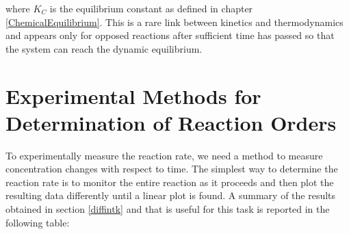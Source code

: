 \documentclass[
  9pt,
]{extbook}
\theoremstyle{definition}
\theoremstyle{definition}
\theoremstyle{definition}
\theoremstyle{remark}
\begin{document}
where \(K_C\) is the equilibrium constant as defined in chapter \ref{ChemicalEquilibrium}. This is a rare link between kinetics and thermodynamics and appears only for opposed reactions after sufficient time has passed so that the system can reach the dynamic equilibrium.

\hypertarget{experimental-methods-for-determination-of-reaction-orders}{%
\section{Experimental Methods for Determination of Reaction Orders}\label{experimental-methods-for-determination-of-reaction-orders}}

To experimentally measure the reaction rate, we need a method to measure concentration changes with respect to time. The simplest way to determine the reaction rate is to monitor the entire reaction as it proceeds and then plot the resulting data differently until a linear plot is found. A summary of the results obtained in section \ref{diffintk} and that is useful for this task is reported in the following table:

\tiny
\end{document}
